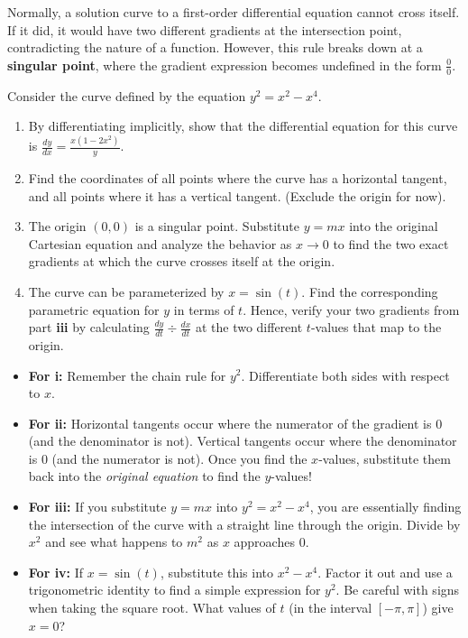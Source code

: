 \begin{problem}
Normally, a solution curve to a first-order differential equation cannot cross itself. If it did, it would have two different gradients at the intersection point, contradicting the nature of a function. However, this rule breaks down at a \textbf{singular point}, where the gradient expression becomes undefined in the form $\frac{0}{0}$. 

Consider the curve defined by the equation $y^2 = x^2 - x^4$.

\begin{enumerate}
    \item[\textbf{i}] By differentiating implicitly, show that the differential equation for this curve is $\frac{dy}{dx} = \frac{x(1 - 2x^2)}{y}$.
    \item[\textbf{ii}] Find the coordinates of all points where the curve has a horizontal tangent, and all points where it has a vertical tangent. (Exclude the origin for now).
    \item[\textbf{iii}] The origin $(0,0)$ is a singular point. Substitute $y=mx$ into the original Cartesian equation and analyze the behavior as $x \to 0$ to find the two exact gradients at which the curve crosses itself at the origin.
    \item[\textbf{iv}] The curve can be parameterized by $x = \sin(t)$. Find the corresponding parametric equation for $y$ in terms of $t$. Hence, verify your two gradients from part \textbf{iii} by calculating $\frac{dy}{dt} \div \frac{dx}{dt}$ at the two different $t$-values that map to the origin.
\end{enumerate}
\end{problem}

\begin{hint}
\begin{itemize}
    \item \textbf{For i:} Remember the chain rule for $y^2$. Differentiate both sides with respect to $x$.
    \item \textbf{For ii:} Horizontal tangents occur where the numerator of the gradient is $0$ (and the denominator is not). Vertical tangents occur where the denominator is $0$ (and the numerator is not). Once you find the $x$-values, substitute them back into the \textit{original equation} to find the $y$-values!
    \item \textbf{For iii:} If you substitute $y=mx$ into $y^2 = x^2 - x^4$, you are essentially finding the intersection of the curve with a straight line through the origin. Divide by $x^2$ and see what happens to $m^2$ as $x$ approaches $0$.
    \item \textbf{For iv:} If $x = \sin(t)$, substitute this into $x^2 - x^4$. Factor it out and use a trigonometric identity to find a simple expression for $y^2$. Be careful with signs when taking the square root. What values of $t$ (in the interval $[-\pi, \pi]$) give $x=0$? 
\end{itemize}
\end{hint}

